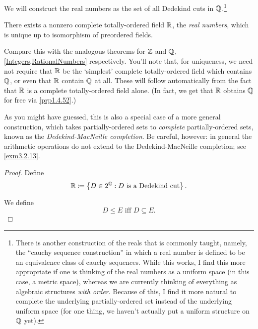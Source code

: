 We will construct the real numbers as the set of all Dedekind cuts in $\mathbb{Q}$.\footnote{There is another construction of the reals that is commonly taught, namely, the ``cauchy sequence construction'' in which a real number is defined to be an equivalence class of cauchy sequences.  While this works, I find this more appropriate if one is thinking of the real numbers as a uniform space (in this case, a metric space), whereas we are currently thinking of everything as algebraic structures \emph{with order}.  Because of this, I find it more natural to complete the underlying partially-ordered set instead of the underlying uniform space (for one thing, we haven't actually put a uniform structure on $\mathbb{Q}$ yet).}
\begin{thm}\label{RealNumbers}
There exists a nonzero complete totally-ordered field $\mathbb{R}$, the \emph{real numbers}, which is unique up to isomorphism of preordered fields.
\begin{rmk}
Compare this with the analogous theorems for $\mathbb{Z}$ and $\mathbb{Q}$, \cref{Integers,RationalNumbers} respectively.  You'll note that, for uniqueness, we need not require that $\mathbb{R}$ be the `simplest' complete totally-ordered field which contains $\mathbb{Q}$, or even that $\mathbb{R}$ contain $\mathbb{Q}$ at all.  These will follow automatically from the fact that $\mathbb{R}$ is a complete totally-ordered field alone.  (In fact, we get that $\mathbb{R}$ obtains $\mathbb{Q}$ for free via \cref{prp1.4.52}.)
\end{rmk}
\begin{rmk}
As you might have guessed, this is also a special case of a more general construction, which takes partially-ordered sets to \emph{complete} partially-ordered sets, known as the \emph{Dedekind-MacNeille completion}.  Be careful, however:  in general the arithmetic operations do not extend to the Dedekind-MacNeille completion; see \cref{exm3.2.13}.
\end{rmk}
\begin{proof}
Define
\begin{equation}
\mathbb{R} \coloneqq \left\{ D\in 2^{\mathbb{Q}}:D\text{ is a Dedekind cut}\right\} .
\end{equation}

We define
\begin{equation}
D\leq E\text{ iff }D\subseteq E.
\end{equation}


\end{proof}
\end{thm}
